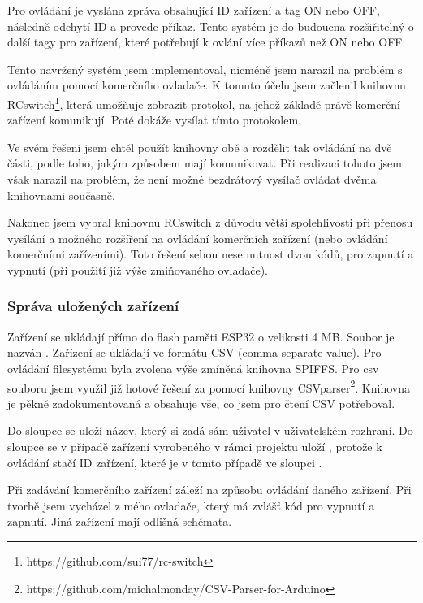\documentclass[11pt,a4paper,twoside,openright]{report}
\begin{document}
Pro ovládání  je vyslána zpráva obsahující ID zařízení a tag ON nebo OFF,  následně odchytí ID a provede příkaz. Tento systém je do budoucna rozšiřitelný o další tagy pro zařízení, které potřebují k ovlání více příkazů než ON nebo OFF.


Tento navržený systém jsem implementoval, nicméně jsem narazil na problém s ovládáním pomocí komerčního ovladače. K tomuto účelu jsem začlenil knihovnu RCswitch\footnote{https://github.com/sui77/rc-switch}, která umožňuje zobrazit protokol, na jehož základě právě komerční zařízení komunikují. Poté dokáže vysílat tímto protokolem. 


Ve svém řešení jsem chtěl použít knihovny obě a rozdělit tak ovládání na dvě části, podle toho, jakým způsobem mají komunikovat. Při realizaci tohoto jsem však narazil na problém, že není možné bezdrátový vysílač ovládat dvěma knihovnami současně.


Nakonec jsem vybral knihovnu RCswitch z důvodu větší spolehlivosti při přenosu vysílání a možného rozšíření na ovládání komerčních zařízení (nebo ovládání komerčními zařízeními). Toto řešení sebou nese nutnost dvou kódů, pro zapnutí a vypnutí (při použití již výše zmiňovaného ovladače). 


\subsubsection{Správa uložených zařízení}

Zařízení se ukládají přímo do flash paměti ESP32 o velikosti 4 MB. Soubor je nazván . Zařízení se ukládají ve formátu CSV (comma separate value). Pro ovládání filesystému byla zvolena výše zmíněná knihovna SPIFFS. Pro  csv souboru jsem využil již hotové řešení za pomocí knihovny CSVparser\footnote{https://github.com/michalmonday/CSV-Parser-for-Arduino}. Knihovna je pěkně zadokumentovaná a obsahuje vše, co jsem pro čtení CSV potřeboval. 


Do sloupce  se uloží název, který si zadá sám uživatel v uživatelském rozhraní. Do sloupce  se v případě zařízení vyrobeného v rámci projektu uloží , protože k ovládání stačí ID zařízení, které je v tomto případě ve sloupci .


Při zadávání komerčního zařízení záleží na způsobu ovládání daného zařízení. Při tvorbě jsem vycházel z mého ovladače, který má zvlášť kód pro vypnutí a zapnutí. Jiná zařízení mají odlišná schémata. 
\end{document}
